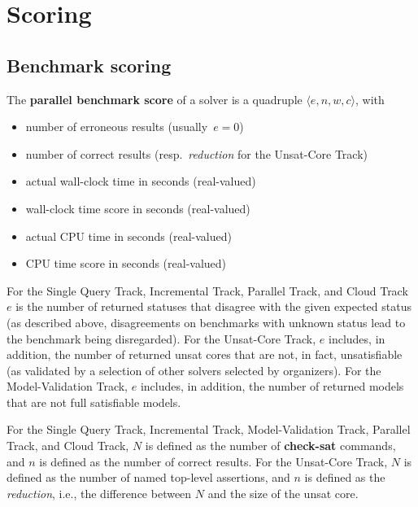 \documentclass[12pt]{article}
\newcommand{\akey}[1]{\textbf{#1}\xspace}
\newcommand{\maintrack}{Single Query Track\xspace}
\newcommand{\inctrack}{Incremental Track\xspace}
\newcommand{\ucoretrack}{Unsat-Core Track\xspace}
\newcommand{\mvaltrack}{Model-Validation Track\xspace}
\newcommand{\paralleltrack}{Parallel Track\xspace}
\newcommand{\cloudtrack}{Cloud Track\xspace}
\begin{document}
\section{Scoring}
\label{sec:scoring}

\subsection{Benchmark scoring}
\label{sec:benchmark-scoring}

The \textbf{parallel benchmark score} of a solver is a quadruple $\langle
e, n, w, c\rangle$, with
\begin{itemize}[noitemsep]
  \vspace{-1ex}
  \item {}
    number of erroneous results (usually~$e = 0$)
  \item {}
    number of correct results (resp.~\emph{reduction} for the \ucoretrack)
  \item {}
    actual wall-clock time in seconds (real-valued)
  \item {}
    wall-clock time score in seconds (real-valued)
  \item {}
    actual CPU time in seconds (real-valued)
  \item {}
    CPU time score in seconds (real-valued)
\end{itemize}

For the \maintrack, \inctrack, \paralleltrack, and \cloudtrack
$e$ is the number of returned
statuses that disagree with the given expected status (as described above,
disagreements on benchmarks with unknown status lead to the benchmark being
disregarded). For the \ucoretrack, $e$ includes, in addition, the number of
returned unsat cores that are not, in fact, unsatisfiable (as
validated by a selection of other solvers selected by organizers).  For the
\mvaltrack, $e$ includes, in addition, the number of returned models that are
not full satisfiable models.

For the \maintrack, \inctrack, \mvaltrack, \paralleltrack, and
\cloudtrack,
$N$ is defined as the number of \akey{check-sat} commands, and
$n$ is defined as the number of correct results.
For the \ucoretrack, $N$ is defined as the number of named top-level assertions,
and $n$ is defined as the \emph{reduction}, i.e., the difference between $N$
and the size of the unsat core.
\end{document}
